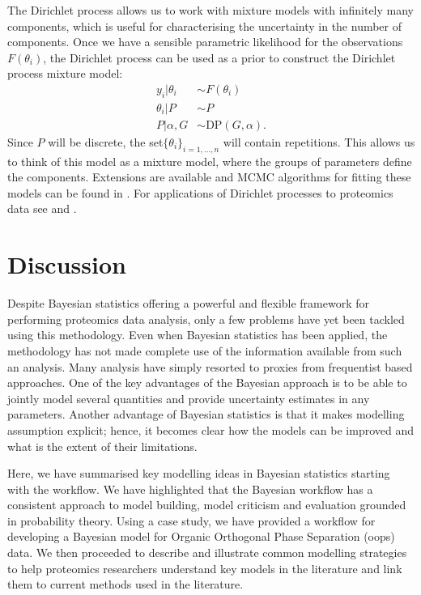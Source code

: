 \documentclass[12pt,english, journal=jpr, layout=twocolumn]{article}
\begin{document}
The Dirichlet process allows us to work with mixture models with infinitely many components, which is useful for characterising the uncertainty in the number of components. Once we have a sensible parametric likelihood for the observations $F(\theta_i)$, the Dirichlet process can be used as a prior to construct the Dirichlet process mixture model:
\begin{equation}
\begin{split}
y_i|\theta_i &\sim F(\theta_i)\\
\theta_i|P &\sim P \\
P|\alpha, G & \sim \text{DP}(G, \alpha).
\end{split}
\end{equation}
Since $P$ will be discrete, the set$\{\theta_i\}_{i = 1,...,n}$ will contain repetitions. This allows us to think of this model as a mixture model, where the groups of parameters define the components. Extensions are available \citep{Teh::2006, Rodriguez::2008} and MCMC algorithms for fitting these models can be found in \citet{Neal::2000}. For applications of Dirichlet processes to proteomics data see \citet{Claassen::2009} and \citet{Choi::2010}.

\section{Discussion}
Despite Bayesian statistics offering a powerful and flexible framework for performing proteomics data analysis, only a few problems have yet been tackled using this methodology. Even when Bayesian statistics has been applied, the methodology has not made complete use of the information available from such an analysis. Many analysis have simply resorted to proxies from frequentist based approaches. One of the key advantages of the Bayesian approach is to be able to jointly model several quantities and provide uncertainty estimates in any parameters. Another advantage of Bayesian statistics is that it makes modelling assumption explicit; hence, it becomes clear how the models can be improved and what is the extent of their limitations.

Here, we have summarised key modelling ideas in Bayesian statistics starting with the workflow. We have highlighted that the Bayesian workflow has a consistent approach to model building, model criticism and evaluation grounded in probability theory. Using a case study, we have provided a workflow for developing a Bayesian model for Organic Orthogonal Phase Separation (oops) data. We then proceeded to describe and illustrate common modelling strategies to help proteomics researchers understand key models in the literature and link them to current methods used in the literature.
\end{document}

